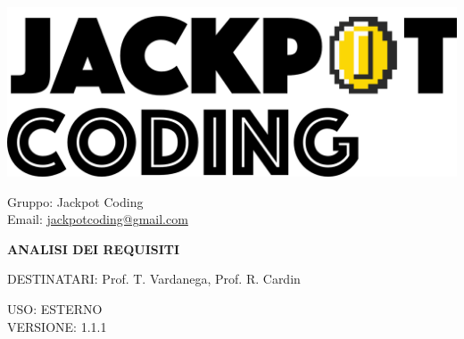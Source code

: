 \documentclass[5pt]{article}
\begin{document}
\begin{minipage}[t]{0.50\textwidth}
    \begin{flushleft}
        \hspace{10pt}
        \includegraphics[scale=0.65]{jackpot-logo.png} 
    \end{flushleft}
\end{minipage}
\hspace{-60pt} %
\begin{flushright}
    \begin{minipage}[t]{0.50\textwidth}
        \begin{flushright}
            Gruppo: {\Large Jackpot Coding}\\
            Email: \href{mailto:jackpotcoding@gmail.com}{jackpotcoding@gmail.com}
        \end{flushright}
    \end{minipage}
\end{flushright}

\vspace{24pt}

\begin{center}
    \textbf{\LARGE ANALISI DEI REQUISITI}
\end{center}

\vspace{13pt}

\begin{flushleft}
    \begin{spacing}{1.5}
        DESTINATARI: Prof. T. Vardanega, Prof. R. Cardin\\
    \end{spacing}
\end{flushleft}

\begin{flushright}
    \begin{spacing}{1}
        USO: ESTERNO\\
        VERSIONE: 1.1.1\\
    \end{spacing}
\end{flushright}
\end{document}
